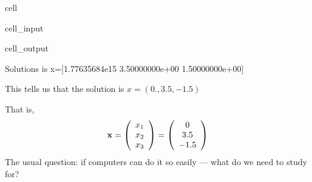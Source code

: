 \documentclass[letterpaper,10pt,english]{jupyterBook}
\begin{document}
\begin{sphinxuseclass}{cell}\begin{sphinxVerbatimInput}

\begin{sphinxuseclass}{cell_input}
\begin{sphinxVerbatim}[commandchars=\\\{\}]
   
   
  \PYG{p}{[}\PYG{p}{[}  \PYG{p}{]}
     \PYG{p}{[}  \PYG{p}{]}
     \PYG{p}{[}  \PYG{p}{]}\PYG{p}{]}
    
    
 
\end{sphinxVerbatim}

\end{sphinxuseclass}\end{sphinxVerbatimInput}
\begin{sphinxVerbatimOutput}

\begin{sphinxuseclass}{cell_output}
\begin{sphinxVerbatim}[commandchars=\\\{\}]
Solutions is x=[\PYGZhy{}1.77635684e\PYGZhy{}15  3.50000000e+00 \PYGZhy{}1.50000000e+00]
\end{sphinxVerbatim}

\end{sphinxuseclass}\end{sphinxVerbatimOutput}

\end{sphinxuseclass}
\sphinxAtStartPar
This tells us that the solution is \(x = (0. , 3.5, -1.5)\)

\sphinxAtStartPar
That is,
\begin{equation*}
\begin{split}
%
{\bf x} =
\left(
\begin{array}{c}
x_1 \\
x_2 \\
x_3
\end{array}
\right)
=
\left(
\begin{array}{c}
0 \\
3.5 \\
-1.5
\end{array}
\right)
%
\end{split}
\end{equation*}
\sphinxAtStartPar
The usual question: if computers can do it so easily — what do we need to study for?
\end{document}
